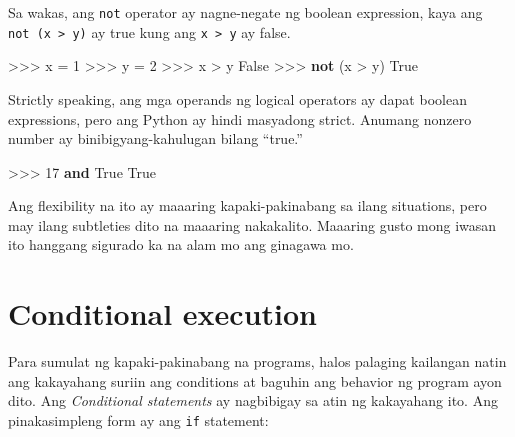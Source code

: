 \documentclass[10pt,]{book}
\newenvironment{Shaded}{}{}
\newcommand{\DecValTok}[1]{\textcolor[rgb]{0.25,0.63,0.44}{#1}}
\newcommand{\KeywordTok}[1]{\textcolor[rgb]{0.00,0.44,0.13}{\textbf{#1}}}
\newcommand{\NormalTok}[1]{#1}
\newcommand{\OperatorTok}[1]{\textcolor[rgb]{0.40,0.40,0.40}{#1}}
\newcommand{\VariableTok}[1]{\textcolor[rgb]{0.10,0.09,0.49}{#1}}
\begin{document}
Sa wakas, ang \texttt{not} operator ay nagne-negate ng boolean
expression, kaya ang \texttt{not\ (x\ \textgreater{}\ y)} ay true kung
ang \texttt{x\ \textgreater{}\ y} ay false.

\begin{Shaded}
\begin{Highlighting}[]
\OperatorTok{\textgreater{}\textgreater{}\textgreater{}}\NormalTok{ x }\OperatorTok{=} \DecValTok{1}
\OperatorTok{\textgreater{}\textgreater{}\textgreater{}}\NormalTok{ y }\OperatorTok{=} \DecValTok{2}
\OperatorTok{\textgreater{}\textgreater{}\textgreater{}}\NormalTok{ x }\OperatorTok{\textgreater{}}\NormalTok{ y}
\VariableTok{False}
\OperatorTok{\textgreater{}\textgreater{}\textgreater{}} \KeywordTok{not}\NormalTok{ (x }\OperatorTok{\textgreater{}}\NormalTok{ y)}
\VariableTok{True}
\end{Highlighting}
\end{Shaded}

Strictly speaking, ang mga operands ng logical operators ay dapat
boolean expressions, pero ang Python ay hindi masyadong strict. Anumang
nonzero number ay binibigyang-kahulugan bilang ``true.''

\begin{Shaded}
\begin{Highlighting}[]
\OperatorTok{\textgreater{}\textgreater{}\textgreater{}} \DecValTok{17} \KeywordTok{and} \VariableTok{True}
\VariableTok{True}
\end{Highlighting}
\end{Shaded}

Ang flexibility na ito ay maaaring kapaki-pakinabang sa ilang
situations, pero may ilang subtleties dito na maaaring nakakalito.
Maaaring gusto mong iwasan ito hanggang sigurado ka na alam mo ang
ginagawa mo.

\section{Conditional execution}\label{conditional-execution-1}

 
  

Para sumulat ng kapaki-pakinabang na programs, halos palaging kailangan
natin ang kakayahang suriin ang conditions at baguhin ang behavior ng
program ayon dito. Ang \emph{Conditional statements} ay nagbibigay sa
atin ng kakayahang ito. Ang pinakasimpleng form ay ang \texttt{if}
statement:
\end{document}
